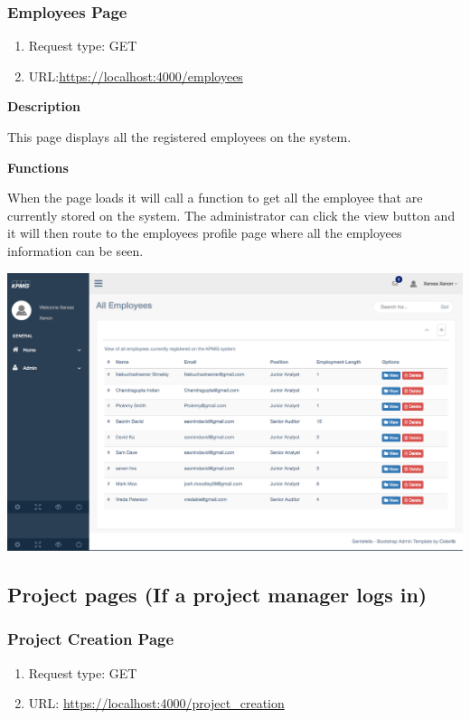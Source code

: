 \documentclass[a4paper,12pt]{article}
\begin{document}
 	\subsubsection{Employees Page}
	 	\begin{enumerate}
	 		\item Request type: GET
	 		\item URL:\url{https://localhost:4000/employees} 
	 	\end{enumerate}
 	\textbf{Description}
	 	\begin{flushleft}
	 		This page displays all the registered employees on the system.
	 	\end{flushleft}
 	\textbf{Functions}
		 \begin{flushleft}
		 	When the page loads it will call a function to get all the employee that are currently stored on the system.
		 	The administrator can click the view button and it will then route to the employees profile page where all the employees information can be seen.
		 \end{flushleft}
	  \includegraphics[width=0.99\linewidth]{Images/admin_dash.png}
	  
	  
	\subsection{Project pages (If a project manager logs in)}
		 \subsubsection{Project Creation Page}
		 		\begin{enumerate}
				 	\item Request type: GET
				 	\item URL: \url{https://localhost:4000/project_creation}
				 \end{enumerate}
				
\end{document}
